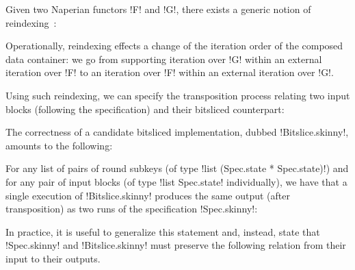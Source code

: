 \documentclass[draft,english]{jflart}
\begin{document}




Given two Naperian functors \coqe!F! and \coqe!G!, there exists a
generic notion of reindexing~\citep{gibbons:apl}:
%

Operationally, reindexing effects a change of the iteration order of
the composed data container: we go from supporting iteration over
\coqe!G! within an external iteration over \coqe!F! to an iteration
over \coqe!F! within an external iteration over \coqe!G!.


Using such reindexing, we can specify the transposition process
relating two input blocks (following the specification) and their
bitsliced counterpart:
%


The correctness of a candidate bitsliced implementation, dubbed
\coqe!Bitslice.skinny!, amounts to the following:
%
\begin{theo}
  For any list of pairs of round subkeys (of type
  \coqe!list (Spec.state * Spec.state)!)
  and for any pair of input blocks (of type
  \coqe!list Spec.state!
  individually), we have that a single execution of
  \coqe!Bitslice.skinny! produces the same output (after
  transposition) as two runs of the specification \coqe!Spec.skinny!:

\end{theo}


In practice, it is useful to generalize this statement and, instead,
state that \coqe!Spec.skinny! and \coqe!Bitslice.skinny! must preserve
the following relation
%
%
from their input to their outputs.
\end{document}
